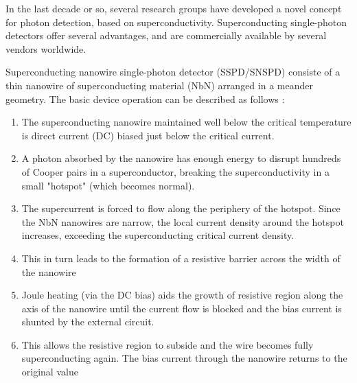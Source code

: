 \documentclass[a4paper,11pt]{article}
\begin{document}
In the last decade or so, several research groups have developed a novel concept for photon detection, based on superconductivity. Superconducting single-photon detectors offer several advantages, and are commercially available by several vendors worldwide.

Superconducting nanowire single-photon detector (SSPD/SNSPD) consiste of a thin nanowire of superconducting material (NbN) arranged in a meander geometry. The basic device operation can be described as follows : 
\begin{enumerate}
    \item The superconducting nanowire maintained well below the critical temperature is direct current (DC) biased just below the critical current.
    \item A photon  absorbed by the nanowire has enough energy to disrupt hundreds of Cooper pairs in a superconductor, breaking the superconductivity in a small "hotspot" (which becomes normal).
    \item The supercurrent is forced to flow along the periphery of the hotspot. Since the NbN nanowires are narrow, the local current density around the hotspot increases, exceeding the superconducting critical current density. 
    \item This in turn leads to the formation of a resistive barrier across the width of the nanowire
    \item Joule heating (via the DC bias) aids the growth of resistive region along the axis of the nanowire until the current flow is blocked and the bias current is shunted by the external circuit.
    \item This allows the resistive region to subside and the wire becomes fully superconducting again. The bias current through the nanowire returns to the original value
\end{enumerate}
\end{document}
